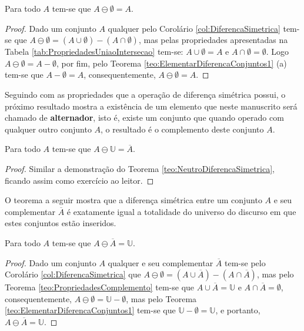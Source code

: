 \begin{theorem}\label{teo:NeutroDiferencaSimetrica}
	Para todo $A$ tem-se que $A \ominus \emptyset = A$.
\end{theorem}

\begin{proof}
	Dado um conjunto $A$ qualquer pelo Corolário \ref{col:DiferencaSimetrica} tem-se que $A \ominus \emptyset = (A \cup \emptyset) - (A \cap \emptyset)$, mas pelas propriedades apresentadas na Tabela \ref{tab:PropriedadesUniaoIntersecao} tem-se: $A \cup \emptyset = A$ e $A \cap \emptyset = \emptyset$. Logo $A \ominus \emptyset = A - \emptyset$, por fim, pelo Teorema \ref{teo:ElementarDiferencaConjuntos1} (a) tem-se que $A - \emptyset = A$, consequentemente, $A \ominus \emptyset = A$.
\end{proof}

Seguindo com as propriedades que a operação de diferença simétrica possui, o próximo resultado mostra a existência de um elemento que neste manuscrito será chamado de \textbf{alternador}, isto é, existe um conjunto que quando operado com qualquer outro conjunto $A$, o resultado é o complemento deste conjunto $A$.

\begin{theorem}\label{teo:InversorDiferencaSimetrica}
	Para todo $A$ tem-se que $A \ominus \mathbb{U} = \overline{A}$.
\end{theorem}

\begin{proof}
	Similar a demonstração do Teorema \ref{teo:NeutroDiferencaSimetrica}, ficando assim como exercício ao leitor.
\end{proof}

O teorema a seguir mostra que a diferença simétrica entre um conjunto $A$ e seu complementar $\overline{A}$ é exatamente igual a totalidade do universo do discurso em que estes conjuntos estão inseridos.

\begin{theorem}
	Para todo $A$ tem-se que $A \ominus \overline{A} = \mathbb{U}$.
\end{theorem}

\begin{proof}
	Dado um conjunto $A$ qualquer e seu complementar $\overline{A}$ tem-se pelo Corolário \ref{col:DiferencaSimetrica}  que 	$A \ominus \emptyset = (A \cup \overline{A}) - (A \cap \overline{A})$, mas pelo Teorema \ref{teo:PropriedadesComplemento} tem-se que $A \cup \overline{A} = \mathbb{U}$ e $A \cap \overline{A} = \emptyset$, consequentemente,  $A \ominus \emptyset = \mathbb{U} -  \emptyset$, mas pelo Teorema \ref{teo:ElementarDiferencaConjuntos1} tem-se que $\mathbb{U} -  \emptyset = \mathbb{U}$, e portanto, $A \ominus \overline{A} = \mathbb{U}$.
\end{proof}

